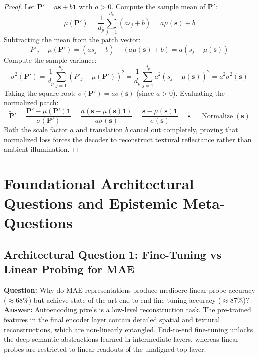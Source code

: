 \documentclass[11pt,a4paper]{article}
\theoremstyle{definition}
\begin{document}
\begin{proof}
Let $\mathbf{P}' = a \mathbf{s} + b \mathbf{1}$ with $a > 0$.
Compute the sample mean of $\mathbf{P}'$:
{\boldmath
\begin{equation}
\mu(\mathbf{P}') = \frac{1}{d_p}\sum_{j=1}^{d_p} (a s_j + b) = a \mu(\mathbf{s}) + b
\end{equation}
}
Subtracting the mean from the patch vector:
{\boldmath
\begin{equation}
P'_j - \mu(\mathbf{P}') = (a s_j + b) - (a \mu(\mathbf{s}) + b) = a (s_j - \mu(\mathbf{s}))
\end{equation}
}
Compute the sample variance:
{\boldmath
\begin{equation}
\sigma^2(\mathbf{P}') = \frac{1}{d_p}\sum_{j=1}^{d_p} \left( P'_j - \mu(\mathbf{P}') \right)^2 = \frac{1}{d_p}\sum_{j=1}^{d_p} a^2 (s_j - \mu(\mathbf{s}))^2 = a^2 \sigma^2(\mathbf{s})
\end{equation}
}
Taking the square root: $\sigma(\mathbf{P}') = a \sigma(\mathbf{s})$ (since $a > 0$).
Evaluating the normalized patch:
{\boldmath
\begin{equation}
\tilde{\mathbf{P}}' = \frac{\mathbf{P}' - \mu(\mathbf{P}')\mathbf{1}}{\sigma(\mathbf{P}')} = \frac{a (\mathbf{s} - \mu(\mathbf{s})\mathbf{1})}{a \sigma(\mathbf{s})} = \frac{\mathbf{s} - \mu(\mathbf{s})\mathbf{1}}{\sigma(\mathbf{s})} = \tilde{\mathbf{s}} = \operatorname{Normalize}(\mathbf{s})
\end{equation}
}
Both the scale factor $a$ and translation $b$ cancel out completely, proving that normalized loss forces the decoder to reconstruct textural reflectance rather than ambient illumination.
\end{proof}

\section{Foundational Architectural Questions and Epistemic Meta-Questions}

\subsection{Architectural Question 1: Fine-Tuning vs Linear Probing for MAE}
\textbf{Question:} Why do MAE representations produce mediocre linear probe accuracy ($\approx 68\%$) but achieve state-of-the-art end-to-end fine-tuning accuracy ($\approx 87\%$)?\\
\textbf{Answer:} Autoencoding pixels is a low-level reconstruction task. The pre-trained features in the final encoder layer contain detailed spatial and textural reconstructions, which are non-linearly entangled. End-to-end fine-tuning unlocks the deep semantic abstractions learned in intermediate layers, whereas linear probes are restricted to linear readouts of the unaligned top layer.
\end{document}
